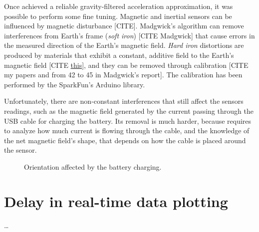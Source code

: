 Once achieved a reliable gravity-filtered acceleration approximation, it was possible to perform some fine tuning. Magnetic and inertial sensors can be influenced by magnetic disturbance [CITE]. Madgwick's algorithm can remove interferences from Earth's frame (\textit{soft iron}) [CITE Madgwick] that cause errors in the measured direction of the Earth's magnetic field. \textit{Hard iron} distortions are produced by materials that exhibit a constant, additive field to the Earth's magnetic field [CITE \href{https://www.fierceelectronics.com/components/compensating-for-tilt-hard-iron-and-soft-iron-effects}{this}], and they can be removed through calibration [CITE my papers and from 42 to 45 in Madgwick's report]. The calibration has been performed by the SparkFun's Arduino library.

Unfortunately, there are non-constant interferences that still affect the sensors readings, such as the magnetic field generated by the current passing through the USB cable for charging the battery.
Its removal is much harder, because requires to analyze how much current is flowing through the cable, and the knowledge of the net magnetic field's shape, that depends on how the cable is placed around the sensor.
\bigbreak

\begin{center}
	\begin{figure}[ht!]
		\caption{Orientation affected by the battery charging.}
	\end{figure}
\end{center}

\section{Delay in real-time data plotting}
\dots
